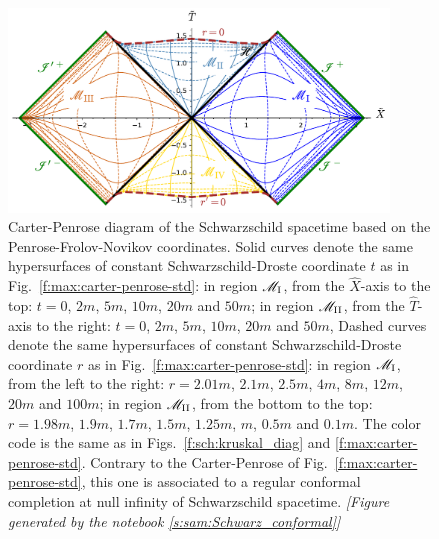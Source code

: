 \begin{figure}
\centerline{\includegraphics[width=0.9\textwidth]{max_carter-penrose-FN.pdf}}
\caption[]{\label{f:max:carter-penrose-FN} \footnotesize
Carter-Penrose diagram of the Schwarzschild spacetime based on the Penrose-Frolov-Novikov coordinates.
Solid curves denote the same hypersurfaces of constant Schwarzschild-Droste coordinate
$t$ as in Fig.~\ref{f:max:carter-penrose-std}: in region $\mathscr{M}_{\rm I}$, from the $\hat{X}$-axis to the top: $t=0$, $2m$,
$5m$, $10m$, $20m$ and $50m$;
in region $\mathscr{M}_{\rm II}$, from the $\hat{T}$-axis
to the right: $t=0$, $2m$, $5m$, $10m$, $20m$ and $50m$,
Dashed curves denote the same hypersurfaces of constant Schwarzschild-Droste coordinate
$r$ as in Fig.~\ref{f:max:carter-penrose-std}: in region $\mathscr{M}_{\rm I}$, from the left to the right: $r=2.01m$, $2.1m$, $2.5m$, $4m$, $8m$, $12m$, $20m$ and $100m$;
in region $\mathscr{M}_{\rm II}$, from the bottom to the top: $r=1.98m$, $1.9m$, $1.7m$,
$1.5m$, $1.25m$, $m$, $0.5m$ and $0.1m$.
The color code is the same as in Figs.~\ref{f:sch:kruskal_diag} and \ref{f:max:carter-penrose-std}.
Contrary to the Carter-Penrose of Fig.~\ref{f:max:carter-penrose-std}, this one is
associated to a regular conformal completion at null infinity of Schwarzschild spacetime.
\textsl{[Figure generated by the notebook \ref{s:sam:Schwarz_conformal}]}
}
\end{figure}



